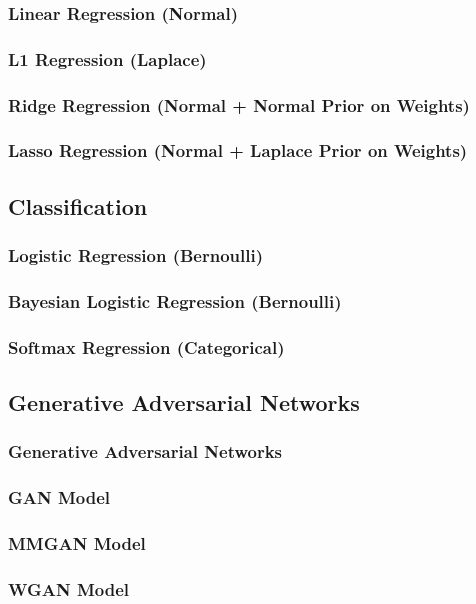 \documentclass{article}
\begin{document}
\subsubsection{Linear Regression (Normal)}
\subsubsection{L1 Regression (Laplace)}
\subsubsection{Ridge Regression (Normal + Normal Prior on Weights)}
\subsubsection{Lasso Regression (Normal + Laplace Prior on Weights)}

\subsection{Classification}
\subsubsection{Logistic Regression (Bernoulli)}
\subsubsection{Bayesian Logistic Regression (Bernoulli)}
\subsubsection{Softmax Regression (Categorical)}

\subsection{Generative Adversarial Networks}
\subsubsection{Generative Adversarial Networks}
\subsubsection{GAN Model}
\subsubsection{MMGAN Model}
\subsubsection{WGAN Model}
\end{document}

